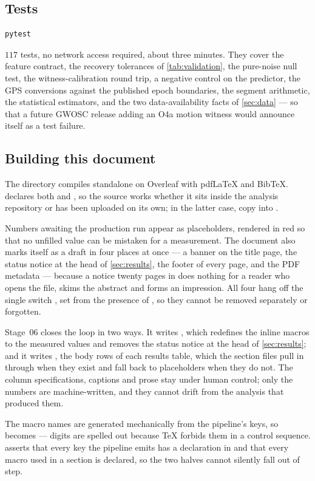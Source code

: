 \subsection{Tests}

\begin{lstlisting}[language=bash]
pytest
\end{lstlisting}

$117$ tests, no network access required, about three minutes. They cover the
feature contract, the recovery tolerances of \cref{tab:validation}, the
pure-noise null test, the witness-calibration round trip, a negative control
on the predictor, the GPS conversions against the published epoch boundaries,
the segment arithmetic, the statistical estimators, and the two
data-availability facts of \cref{sec:data} --- so that a future GWOSC release
adding an O4a motion witness would announce itself as a test failure.

\subsection{Building this document}

The  directory compiles standalone on Overleaf with pdf\LaTeX{}
and Bib\TeX{}.  declares both
 and , so the source works whether it
sits inside the analysis repository or has been uploaded on its own; in the
latter case, copy  into .

Numbers awaiting the production run appear as 
placeholders, rendered in red so that no unfilled value can be mistaken for a
measurement. The document also marks itself as a draft in four places at
once --- a banner on the title page, the status notice at the head of
\cref{sec:results}, the footer of every page, and the PDF metadata ---
because a notice twenty pages in does nothing for a reader who opens the
file, skims the abstract and forms an impression. All four hang off the
single switch , set from the
presence of , so they cannot be removed separately or
forgotten.

Stage~06 closes the loop in two ways. It writes
, which redefines the inline macros to the measured
values and removes the status notice at the head of \cref{sec:results}; and it
writes , the body rows of each results table,
which the section files pull in through  when
they exist and fall back to placeholders when they do not. The column
specifications, captions and prose stay under human control; only the numbers
are machine-written, and they cannot drift from the analysis that produced
them.

The macro names are generated mechanically from the pipeline's keys, so
 becomes
 --- digits are spelled out
because \TeX{} forbids them in a control sequence.
 asserts that every key the pipeline emits has a
declaration in  and that every macro used in a section is
declared, so the two halves cannot silently fall out of step.
